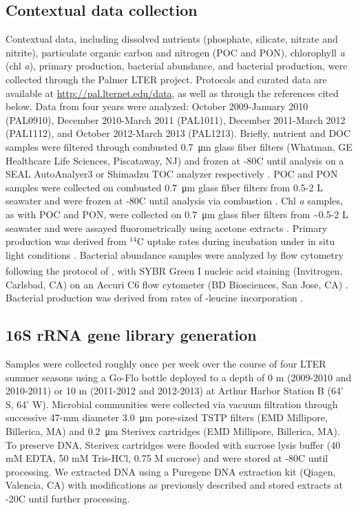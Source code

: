 \subsection{Contextual data collection}

Contextual data, including dissolved nutrients (phosphate, silicate, nitrate and nitrite), particulate organic carbon and nitrogen (POC and PON), chlorophyll \emph{a} (chl \emph{a}), primary production, bacterial abundance, and bacterial production, were collected through the Palmer LTER project. Protocols and curated data are available at \url{http://pal.lternet.edu/data}, as well as through the references cited below. Data from four years were analyzed: October 2009-January 2010 (PAL0910), December 2010-March 2011 (PAL1011), December 2011-March 2012 (PAL1112), and October 2012-March 2013 (PAL1213). Briefly, nutrient and DOC samples were filtered through combusted \SI{0.7}{\micro\meter} glass fiber filters (Whatman, GE Healthcare Life Sciences, Piscataway, NJ) and frozen at -80\textdegree C until analysis on a SEAL AutoAnalyer3 \citep{ducklow_doi_2016a} or Shimadzu TOC analyzer respectively \citep{ducklow_doi_2016c}. POC and PON samples were collected on combusted \SI{0.7}{\micro\meter} glass fiber filters from 0.5-2 L seawater and were frozen at -80\textdegree C until analysis via combustion \citep{ducklow_doi_2016d}. Chl \emph{a} samples, as with POC and PON, were collected on \SI{0.7}{\micro\meter} glass fiber filters from \textasciitilde{}0.5-2 L seawater and were assayed fluorometrically using acetone extracts \citep{schofield_doi_2016}. Primary production was derived from $^{14}$C uptake rates during incubation under in situ light conditions \citep{schofield_doi_2016a}. Bacterial abundance samples were analyzed by flow cytometry following the protocol of \citealt{Gasol2000-mn}, with SYBR\textsuperscript{\textregistered} Green I nucleic acid staining (Invitrogen, Carlsbad, CA) on an Accuri C6 flow cytometer (BD Biosciences, San Jose, CA) \citep{schofield_doi_2016}. Bacterial production was derived from rates of -leucine incorporation \citep{ducklow_doi_2016b}.

\subsection{16S rRNA gene library generation}

Samples were collected roughly once per week over the course of four LTER summer seasons using a Go-Flo bottle deployed to a depth of 0 m (2009-2010 and 2010-2011) or 10 m (2011-2012 and 2012-2013) at Arthur Harbor Station B (64' S, 64' W). Microbial communities were collected via vacuum filtration through successive 47-mm diameter \SI{3.0}{\micro\meter} pore-sized TSTP filters (EMD Millipore, Billerica, MA) and \SI{0.2}{\micro\meter} Sterivex{\texttrademark} cartridges (EMD Millipore, Billerica, MA). To preserve DNA, Sterivex cartridges were flooded with sucrose lysis buffer (40 mM EDTA, 50 mM Tris-HCl, 0.75 M sucrose) and were stored at -80\textdegree C until processing. We extracted DNA using a Puregene DNA extraction kit (Qiagen, Valencia, CA) with modifications as previously described \citep{amdh09} and stored extracts at -20\textdegree C until further processing. 

